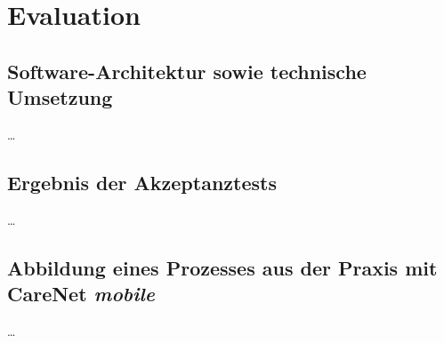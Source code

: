 
\chapter{Evaluation}
\label{ch:Evaluation}

\section{Software-Architektur sowie technische Umsetzung}
\dots

\section{Ergebnis der Akzeptanztests}
\dots

\section{Abbildung eines Prozesses aus der Praxis mit CareNet \textit{mobile}}
\dots

